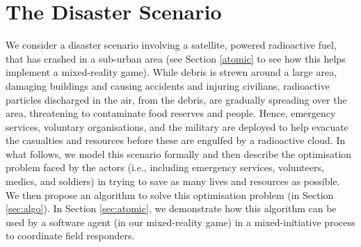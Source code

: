 \section{The Disaster Scenario}
\label{sec:scenario}

\noindent We consider a disaster scenario involving a satellite, powered radioactive fuel, that has crashed in a sub-urban area (see Section \ref{atomic} to see how this helps implement a  mixed-reality game). While debris is strewn around a large area, damaging buildings and causing accidents and injuring civilians, radioactive particles discharged in the air, from the debris, are gradually spreading over the area, threatening to contaminate food reserves and people. Hence, emergency services, voluntary organisations, and the military are deployed to help evacuate the casualties and resources before these are engulfed by a radioactive cloud.  In what follows, we model this scenario formally and then describe the optimisation problem faced by the actors  (i.e., including emergency services, volunteers, medics, and soldiers) in trying to save as many lives and resources as possible.  We then propose an algorithm to solve this optimisation problem (in Section \ref{sec:algo}). In Section \ref{sec:atomic}, we demonstrate how this algorithm can be used by a software agent (in our mixed-reality game) in a mixed-initiative process to coordinate field responders. 

